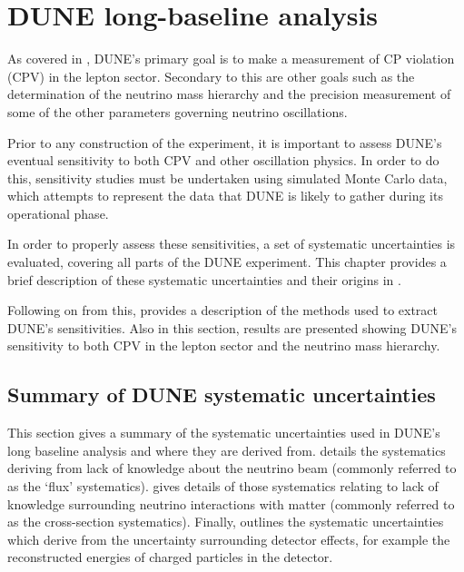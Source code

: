 \chapter{DUNE long-baseline analysis}
\label{sec:dune_lbl}

As covered in , DUNE's primary goal is to make a measurement of CP violation (CPV) in the lepton sector.
Secondary to this are other goals such as the determination of the neutrino mass hierarchy and the precision measurement of some of the other parameters governing neutrino oscillations.

Prior to any construction of the experiment, it is important to assess DUNE's eventual sensitivity to both CPV and other oscillation physics.
In order to do this, sensitivity studies must be undertaken using simulated Monte Carlo data, which attempts to represent the data that DUNE is likely to gather during its operational phase.

In order to properly assess these sensitivities, a set of systematic uncertainties is evaluated, covering all parts of the DUNE experiment.
This chapter provides a brief description of these systematic uncertainties and their origins in .

Following on from this,  provides a description of the methods used to extract DUNE's sensitivities.
Also in this section, results are presented showing DUNE's sensitivity to both CPV in the lepton sector and the neutrino mass hierarchy.

\section{Summary of DUNE systematic uncertainties}
\label{sec:dune_lbl:systs}

This section gives a summary of the systematic uncertainties used in DUNE's long baseline analysis and where they are derived from.
 details the systematics deriving from lack of knowledge about the neutrino beam (commonly referred to as the `flux' systematics).
 gives details of those systematics relating to lack of knowledge surrounding neutrino interactions with matter (commonly referred to as the cross-section systematics).
Finally,  outlines the systematic uncertainties which derive from the uncertainty surrounding detector effects, for example the reconstructed energies of charged particles in the detector.

